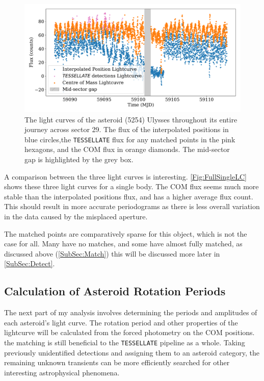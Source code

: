 \documentclass{UCreport}
\begin{document}
\begin{figure}
  \centering
  \includegraphics[width =\textwidth]{./Figures/SingleBodyLCUlyssesgapSpan.pdf}
  \caption[Light curves Example]{The light curves of the asteroid (5254) Ulysses throughout its entire journey across sector 29. 
  The flux of the interpolated positions in blue circles,the \texttt{TESSELLATE} flux for any matched points in the pink hexagons, and the COM flux in orange diamonds.
  The mid-sector gap is highlighted by the grey box.}
  \label{Fig:FullSingleLC}
\end{figure}

A comparison between the three light curves is interesting.
\autoref{Fig:FullSingleLC} shows these three light curves for a single body.
The COM flux seems much more stable than the interpolated positions flux, and has a higher average flux count.
This should result in more accurate periodograms as there is less overall variation in the data caused by the misplaced aperture.

The matched points are comparatively sparse for this object, which is not the case for all.
Many have no matches, and some have almost fully matched, as discussed above (\autoref{SubSec:Match}) this will be discussed more later in \autoref{SubSec:Detect}.



\subsection{Calculation of Asteroid Rotation Periods}\label{SubSec:Periods}

The next part of my analysis involves determining the periods and amplitudes of each asteroid's light curve.
The rotation period and other properties of the lightcurve will be calculated from the forced photometry on the COM positions. the matching is still beneficial to the \texttt{TESSELLATE} pipeline as a whole.
Taking previously unidentified detections and assigning them to an asteroid category, the remaining unknown transients can be more efficiently searched for other interesting astrophysical phenomena.
\end{document}
